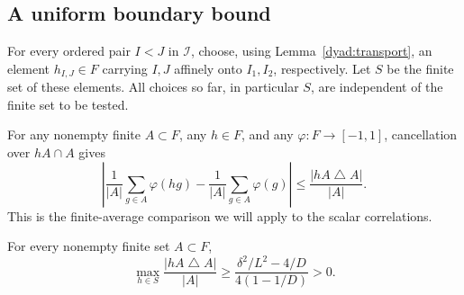 \subsection{A uniform boundary bound}\label{sec:boundary}

For every
ordered pair $I<J$ in $\mathcal I$, choose, using
Lemma~\ref{dyad:transport}, an element $h_{I,J}\in F$ carrying
$I,J$ affinely onto $I_1,I_2$, respectively.  Let $S$ be the finite
set of these elements.  All choices so far, in particular $S$, are
independent of the finite set to be tested.

For any nonempty finite \(A\subset F\), any \(h\in F\), and any
\(\varphi:F\to[-1,1]\), cancellation over \(hA\cap A\) gives
\begin{equation}\label{eq:finite-translation}
 \left|\frac1{|A|}\sum_{g\in A}\varphi(hg)
       -\frac1{|A|}\sum_{g\in A}\varphi(g)\right|
 \le\frac{|hA\mathbin{\triangle}A|}{|A|}.
\end{equation}
This is the finite-average comparison we will apply to the scalar
correlations.

\begin{proposition}\label{avg:boundary}
For every nonempty finite set $A\subset F$,
\begin{equation}\label{avg:boundary-bound}
  \max_{h\in S}\frac{|hA\mathbin{\triangle}A|}{|A|}
  \geq \frac{\delta^2/L^2-4/D}{4(1-1/D)}>0.
\end{equation}
\end{proposition}

